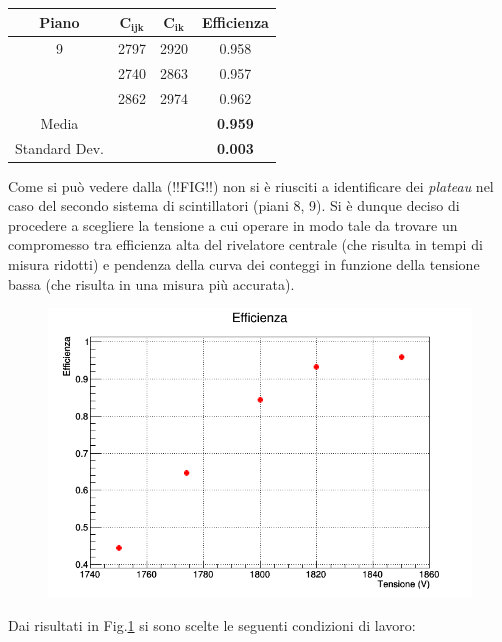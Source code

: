 \documentclass[11pt]{article}
\begin{document}
\begin{flushleft}
\begin{tabular}{|c|c|c|c|}
\hline 
\textbf{Piano} & $\mathbf{C_{ijk}}$ & $\mathbf{C_{ik}}$ & \textbf{Efficienza} \\
\hline 
9 & 2797 & 2920 & 0.958 \\ 
\hline 
\hphantom & 2740 & 2863 & 0.957 \\ 
\hline 
\hphantom & 2862 & 2974 & 0.962 \\ 
\hline 
Media & \hphantom & \hphantom & \textbf{0.959} \\ 
\hline 
Standard Dev. & \hphantom & \hphantom & \textbf{0.003} \\ 
\hline 
\end{tabular} 
\vspace{0.8 cm}

Come si può vedere dalla (!!FIG!!) non si è riusciti a identificare dei \textit{plateau} nel caso del secondo sistema di scintillatori (piani 8, 9). Si è dunque deciso di procedere a scegliere la tensione a cui operare in modo tale da trovare un compromesso tra efficienza alta del rivelatore centrale (che risulta in tempi di misura ridotti) e pendenza della curva dei conteggi in funzione della tensione bassa (che risulta in una misura più accurata). 

\begin{center}
\begin{figure}
\includegraphics[width=\textwidth]{"eff_tens"}
\label{fig:eff_tens}
\end{figure}
\end{center}

Dai risultati in Fig.\ref{fig:eff_tens} si sono scelte le seguenti condizioni di lavoro:


\end{flushleft}
\end{document}
